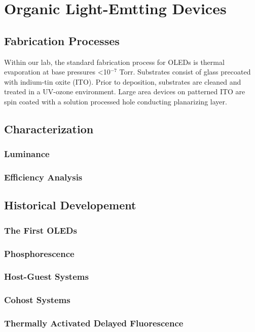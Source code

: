\documentclass[../thesis.tex]{subfiles}
\begin{document}
\chapter{Organic Light-Emtting Devices}\label{sec:oleds}

\section{Fabrication Processes}

Within our lab, the standard fabrication process for OLEDs is thermal evaporation at base pressures <10$^{-7}$ Torr.  Substrates consist of glass precoated with indium-tin oxite (ITO).  Prior to deposition, substrates are cleaned and treated in a UV-ozone environment.  Large area devices on patterned ITO are spin coated with a solution processed hole conducting planarizing layer.

\section{Characterization}
\subsection{Luminance}
\subsection{Efficiency Analysis}

\section{Historical Developement}
\subsection{The First OLEDs}
\subsection{Phosphorescence}
\subsection{Host-Guest Systems}
\subsection{Cohost Systems}
\subsection{Thermally Activated Delayed Fluorescence}
\end{document}
